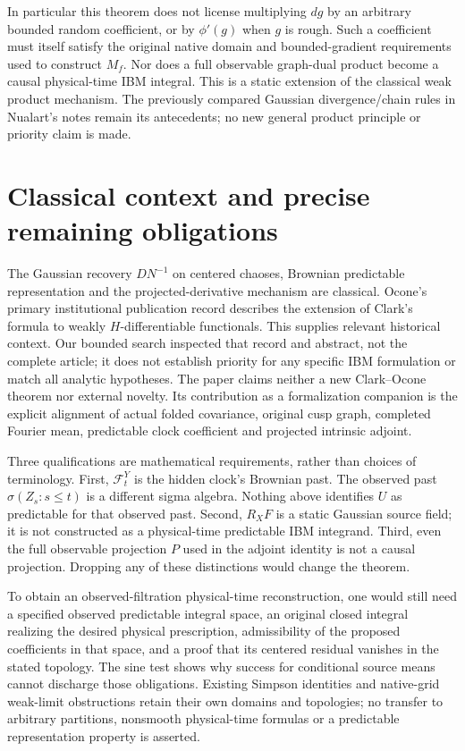 \documentclass[11pt]{article}
\begin{document}
In particular this theorem does not license multiplying $dg$
by an arbitrary bounded random coefficient, or by
$\phi'(g)$ when $g$ is rough. Such a coefficient must itself
satisfy the original native domain and bounded-gradient
requirements used to construct $M_f$. Nor does a full
observable graph-dual product become a causal physical-time
IBM integral. This is a static extension of the classical
weak product mechanism. The previously compared Gaussian
divergence/chain rules in Nualart's notes remain its
antecedents; no new general product principle or priority
claim is made.

\section{Classical context and precise remaining obligations}
The Gaussian recovery $DN^{-1}$ on centered chaoses, Brownian predictable
representation and the projected-derivative mechanism are classical.
Ocone's primary institutional publication record \cite{ocone} describes
the extension of Clark's formula to weakly $H$-differentiable functionals.
This supplies relevant historical context. Our bounded search inspected
that record and abstract, not the complete article; it does not establish
priority for any specific IBM formulation or match all analytic hypotheses.
The paper claims neither a new Clark--Ocone theorem nor external novelty.
Its contribution as a formalization companion is the explicit alignment of
actual folded covariance, original cusp graph, completed Fourier mean,
predictable clock coefficient and projected intrinsic adjoint.

Three qualifications are mathematical requirements, rather than choices of
terminology. First, $\mathcal F_t^Y$ is the hidden clock's Brownian past.
The observed past $\sigma(Z_s:s\leq t)$ is a different sigma algebra.
Nothing above identifies $U$ as predictable for that observed past.
Second, $R_XF$ is a static Gaussian source field; it is not constructed as
a physical-time predictable IBM integrand. Third, even the full observable
projection $P$ used in the adjoint identity is not a causal projection.
Dropping any of these distinctions would change the theorem.

To obtain an observed-filtration physical-time reconstruction, one would
still need a specified observed predictable integral space, an original
closed integral realizing the desired physical prescription, admissibility
of the proposed coefficients in that space, and a proof that its centered
residual vanishes in the stated topology. The sine test shows why success
for conditional source means cannot discharge those obligations. Existing
Simpson identities and native-grid weak-limit obstructions retain their own
domains and topologies; no transfer to arbitrary partitions, nonsmooth
physical-time formulas or a predictable representation property is asserted.
\end{document}
